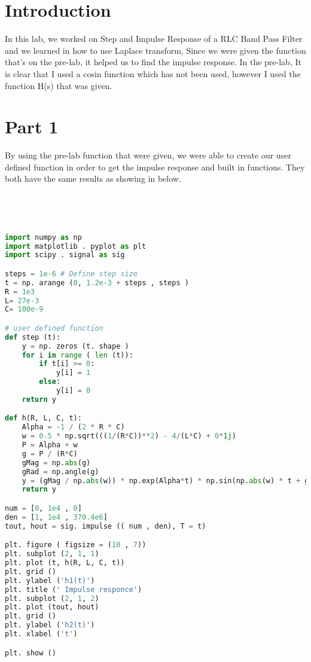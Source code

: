 \documentclass[12pt]{report}
\begin{document}
\section{Introduction}
 

In this lab, we worked on Step and Impulse Response of a RLC Band Pass Filter and we learned in how to use Laplace transform, Since we were given the function that’s on the pre-lab, it helped us to find the impulse response. In the pre-lab, It is clear that I used a cosin function which has not been used, however I used the function H(s) that was given.




\section{Part 1}

By using the pre-lab function that were given, we were able to create our user defined function in order to get the impulse response and built in functions. They both have the same results as showing in below.





\begin{lstlisting}[language=Python]




import numpy as np
import matplotlib . pyplot as plt
import scipy . signal as sig

steps = 1e-6 # Define step size
t = np. arange (0, 1.2e-3 + steps , steps ) 
R = 1e3
L= 27e-3
C= 100e-9

# user defined function
def step (t): 
    y = np. zeros (t. shape ) 
    for i in range ( len (t)): 
        if t[i] >= 0:  
            y[i] = 1
        else:
            y[i] = 0
    return y 

def h(R, L, C, t):
    Alpha = -1 / (2 * R * C)
    w = 0.5 * np.sqrt(((1/(R*C))**2) - 4/(L*C) + 0*1j)
    P = Alpha + w 
    g = P / (R*C)
    gMag = np.abs(g)
    gRad = np.angle(g)
    y = (gMag / np.abs(w)) * np.exp(Alpha*t) * np.sin(np.abs(w) * t + gRad) * step (t) 
    return y

num = [0, 1e4 , 0]
den = [1, 1e4 , 370.4e6]
tout, hout = sig. impulse (( num , den), T = t)

plt. figure ( figsize = (10 , 7))
plt. subplot (2, 1, 1)
plt. plot (t, h(R, L, C, t))
plt. grid ()
plt. ylabel ('h1(t)')
plt. title (' Impulse responce')
plt. subplot (2, 1, 2)
plt. plot (tout, hout)
plt. grid ()
plt. ylabel ('h2(t)')
plt. xlabel ('t')

plt. show ()





\end{lstlisting}
\end{document}
